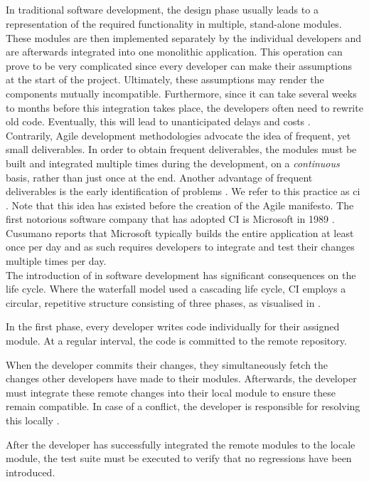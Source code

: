 
\subsection{\CI}
In traditional software development, the design phase usually leads to a representation of the required functionality in multiple, stand-alone modules. These modules are then implemented separately by the individual developers and are afterwards integrated into one monolithic application. This operation can prove to be very complicated since every developer can make their assumptions at the start of the project. Ultimately, these assumptions may render the components mutually incompatible. Furthermore, since it can take several weeks to months before this integration takes place, the developers often need to rewrite old code. Eventually, this will lead to unanticipated delays and costs \cite{SmartJenkinsDefinitive}.\\

\noindent Contrarily, Agile development methodologies advocate the idea of frequent, yet small deliverables. In order to obtain frequent deliverables, the modules must be built and integrated multiple times during the development, on a \emph{continuous} basis, rather than just once at the end. Another advantage of frequent deliverables is the early identification of problems \cite{gitlabci}. We refer to this practice as \acrfull{ci} \cite{SmartJenkinsDefinitive}. Note that this idea has existed before the creation of the Agile manifesto. The first notorious software company that has adopted CI is Microsoft in 1989 \cite{cusumanomicrosoft}. Cusumano reports that Microsoft typically builds the entire application at least once per day and as such requires developers to integrate and test their changes multiple times per day.\\

\noindent The introduction of \CI{} in software development has significant consequences on the life cycle. Where the waterfall model used a cascading life cycle, CI employs a circular, repetitive structure consisting of three phases, as visualised in .

\begin{enumerate}
	 In the first phase, every developer writes code individually for their assigned module. At a regular interval, the code is committed to the remote repository.
	
	 When the developer commits their changes, they simultaneously fetch the changes other developers have made to their modules. Afterwards, the developer must integrate these remote changes into their local module to ensure these remain compatible. In case of a conflict, the developer is responsible for resolving this locally \cite{martin2014}.
	
	 After the developer has successfully integrated the remote modules to the locale module, the test suite must be executed to verify that no regressions have been introduced.
\end{enumerate}

